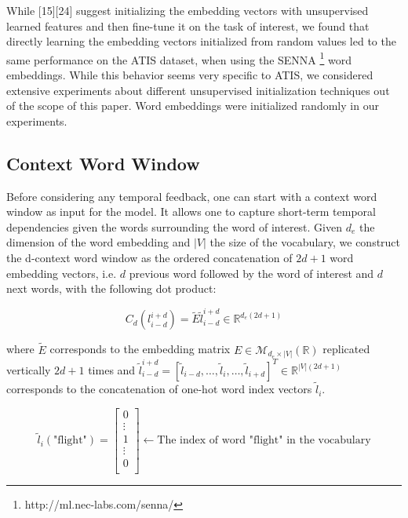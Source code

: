 While [15][24] suggest initializing the embedding vectors with unsupervised
learned features and then fine-tune it on the task of interest, we found that
directly learning the embedding vectors initialized from random values led to
the same performance on the ATIS dataset, when using the SENNA
\footnote{http://ml.nec-labs.com/senna/} word embeddings. While this behavior
seems very specific to ATIS, we considered extensive experiments about
different unsupervised initialization techniques out of the scope of this
paper. Word embeddings were initialized randomly in our experiments.

\subsection{Context Word Window}

Before considering any temporal feedback, one can start with a context word
window as input for the model. It allows one to capture short-term temporal
dependencies given the words surrounding the word of interest. Given $d_e$ the
dimension of the word embedding and $|V|$ the size of the vocabulary, we
construct the d-context word window as the ordered concatenation of $2d+1$ word
embedding vectors, i.e. $d$ previous word followed by the word of interest and $d$
next words, with the following dot product:

\begin{equation}
C_{d}(l_{i-d}^{i+d}) = \tilde{E}\tilde{l}_{i-d}^{i+d}\in\mathbb{R}^{d_{e} (2d+1)}
\end{equation}

where $\tilde{E}$ corresponds to the embedding matrix
$E\in\mathcal{M}_{d_e\times|V|}(\mathbb{R})$ replicated vertically $2d+1$ times
and $\tilde{l}_{i-d}^{i+d}= [
\tilde{l}_{i-d},\dots,\tilde{l}_i,\dots,\tilde{l}_{i+d}]^T\in\mathbb{R}^{|V|(2d+1)}$
corresponds to the concatenation of one-hot word index vectors $\tilde{l}_i$.

\begin{equation}
\tilde{l}_{i}(\textrm{"flight"}) =
\begin{bmatrix}
0\\
\vdots\\
1\\
\vdots\\
0\\
\end{bmatrix} 
\leftarrow \textrm{The index of word "flight" in the vocabulary}
\end{equation}

